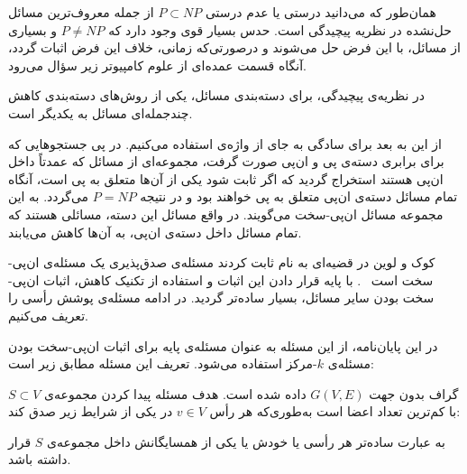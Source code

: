 همان‌طور که می‌دانید درستی یا عدم درستی $P \subset NP$ از جمله معروف‌ترین مسائل حل‌نشده در نظریه پیچیدگی است.
حدس بسیار قوی وجود دارد که $P \neq NP$ و بسیاری از مسائل، با این فرض حل می‌شوند و درصورتی‌که زمانی، خلاف این فرض اثبات گردد، آنگاه قسمت عمده‌ای از علوم کامپیوتر زیر سؤال می‌رود.

در نظریه‌ی پیچیدگی، برای دسته‌بندی مسائل، یکی از روش‌های دسته‌بندی کاهش چندجمله‌ای مسائل به یکدیگر است. 


از این به بعد برای سادگی به جای  از واژه‌ی  استفاده می‌کنیم.
در پی جستجوهایی که برای برابری دسته‌ی پی و ان‌پی صورت گرفت، مجموعه‌ای از مسائل که عمدتاً داخل ان‌پی هستند استخراج گردید که اگر ثابت شود یکی از آن‌ها متعلق به پی است، آنگاه تمام مسائل دسته‌ی ان‌پی متعلق به پی خواهند بود و در نتیجه $P = NP$ می‌گردد.
به این مجموعه مسائل ان‌پی-سخت می‌گویند.
در واقع مسائل این دسته، مسائلی هستند که تمام مسائل داخل دسته‌ی ان‌پی، به آن‌ها کاهش می‌یابند.

کوک و لوین در قضیه‌ای به نام  ثابت کردند مسئله‌ی صدق‌پذیری یک مسئله‌ی ان‌پی-سخت است ~.
با پایه قرار دادن این اثبات و استفاده از تکنیک کاهش، اثبات ان‌پی-سخت بودن سایر مسائل، بسیار ساده‌تر گردید.
در ادامه مسئله‌ی پوشش رأسی را تعریف می‌کنیم.

در این پایان‌نامه، از این مسئله به عنوان مسئله‌ی پایه برای اثبات ان‌پی-سخت بودن مسئله‌ی $k$-مرکز استفاده می‌شود. تعریف این مسئله مطابق زیر است:


گراف بدون جهت $G(V, E)$ داده شده است. هدف مسئله پیدا کردن مجموعه‌ی $S \subset V$ با کم‌ترین تعداد اعضا است به‌طوری‌که هر رأس $v \in V$ در یکی از شرایط زیر صدق کند:





به عبارت ساده‌تر هر رأسی یا خودش یا یکی از همسایگانش داخل مجموعه‌ی $S$ قرار داشته باشد.

